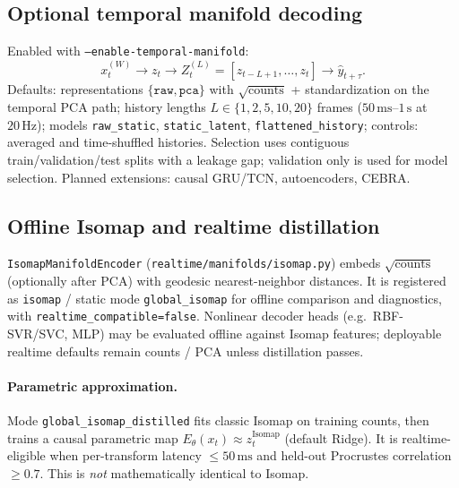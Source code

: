 \documentclass[11pt,a4paper]{article}
\begin{document}
\subsection{Optional temporal manifold decoding}
Enabled with \texttt{--enable-temporal-manifold}:
\begin{equation}
  x_t^{(W)}
  \to
  z_t
  \to
  Z_t^{(L)}=[z_{t-L+1},\ldots,z_t]
  \to
  \hat y_{t+\tau}.
\end{equation}
Defaults: representations $\{\texttt{raw},\texttt{pca}\}$ with $\sqrt{\mathrm{counts}}$ + standardization on the temporal PCA path; history lengths
$L\in\{1,2,5,10,20\}$ frames ($50\,\mathrm{ms}$--$1\,\mathrm{s}$ at $20\,\mathrm{Hz}$);
models \texttt{raw\_static}, \texttt{static\_latent}, \texttt{flattened\_history};
controls: averaged and time-shuffled histories.
Selection uses contiguous train/validation/test splits with a leakage gap; validation only is used for model selection.
Planned extensions: causal GRU/TCN, autoencoders, CEBRA.

\subsection{Offline Isomap and realtime distillation}
\texttt{IsomapManifoldEncoder} (\texttt{realtime/manifolds/isomap.py}) embeds $\sqrt{\mathrm{counts}}$ (optionally after PCA) with geodesic nearest-neighbor distances.
It is registered as \texttt{isomap} / static mode \texttt{global\_isomap} for offline comparison and diagnostics, with \texttt{realtime\_compatible=false}.
Nonlinear decoder heads (e.g.\ RBF-SVR/SVC, MLP) may be evaluated offline against Isomap features; deployable realtime defaults remain counts / PCA unless distillation passes.

\paragraph{Parametric approximation.}
Mode \texttt{global\_isomap\_distilled} fits classic Isomap on training counts, then trains a causal parametric map $E_\theta(x_t)\approx z_t^{\mathrm{Isomap}}$ (default Ridge).
It is realtime-eligible when per-transform latency $\le 50\,\mathrm{ms}$ and held-out Procrustes correlation $\ge 0.7$.
This is \emph{not} mathematically identical to Isomap.
\end{document}
